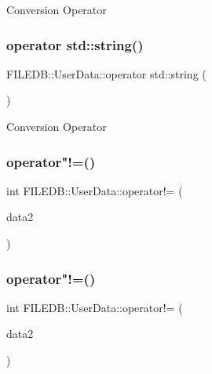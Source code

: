 Conversion Operator \mbox{\label{classFILEDB_1_1UserData_a5e54144b7f24d68684ddc85e036d0605}} 
\subsubsection{\texorpdfstring{operator std::string()}{operator std::string()}\hspace{0.1cm}{\footnotesize\ttfamily [3/3]}}
{\footnotesize\ttfamily F\+I\+L\+E\+D\+B\+::\+User\+Data\+::operator std\+::string (\begin{DoxyParamCaption}\item[{void}]{ }\end{DoxyParamCaption})}

Conversion Operator \mbox{\label{classFILEDB_1_1UserData_acfdc12e0f4dbc6faebe8bf89856fee8d}} 
\subsubsection{\texorpdfstring{operator"!=()}{operator!=()}\hspace{0.1cm}{\footnotesize\ttfamily [1/3]}}
{\footnotesize\ttfamily int F\+I\+L\+E\+D\+B\+::\+User\+Data\+::operator!= (\begin{DoxyParamCaption}\item[{const \mbox{\hyperlink{classFILEDB_1_1UserData}{User\+Data}} \&}]{data2 }\end{DoxyParamCaption})}

\mbox{\label{classFILEDB_1_1UserData_acfdc12e0f4dbc6faebe8bf89856fee8d}} 
\subsubsection{\texorpdfstring{operator"!=()}{operator!=()}\hspace{0.1cm}{\footnotesize\ttfamily [2/3]}}
{\footnotesize\ttfamily int F\+I\+L\+E\+D\+B\+::\+User\+Data\+::operator!= (\begin{DoxyParamCaption}\item[{const \mbox{\hyperlink{classFILEDB_1_1UserData}{User\+Data}} \&}]{data2 }\end{DoxyParamCaption})}

